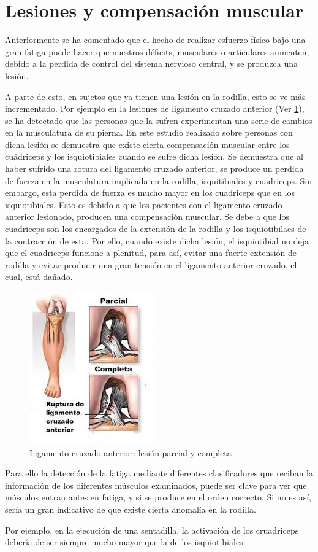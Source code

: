 \section{Lesiones y compensación muscular}\label{compM}
Anteriormente se ha comentado que el hecho de realizar esfuerzo físico bajo una gran fatiga puede hacer que nuestros déficits, musculares o articulares aumenten, debido a la perdida de control del sistema nervioso central, y se produzca una lesión.

A parte de esto, en sujetos que ya tienen una lesión en la rodilla, esto se ve más incrementado. Por ejemplo en la lesiones de ligamento cruzado anterior (Ver \ref{fig:lca}), se ha detectado que las personas que la sufren experimentan una serie de cambios en la musculatura de su pierna. En este estudio realizado sobre personas con dicha lesión \cite{kim2018influencia} se demuestra que existe cierta compensación muscular entre los cuádriceps y los isquiotibiales cuando se sufre dicha lesión. Se demuestra que al haber sufrido una rotura del ligamento cruzado anterior, se produce un perdida de fuerza en la musculatura implicada en la rodilla, isquitibiales y cuadriceps. Sin embargo, esta perdida de fuerza es mucho mayor en los cuadriceps que en los isquiotibiales. Esto es  debido a que los pacientes con el ligamento cruzado anterior lesionado, producen una compensación muscular. Se debe a que los cuadriceps son los encargados de la extensión de la rodilla y los isquiotibilaes de la contracción de esta. Por ello, cuando existe dicha lesión, el isquiotibial no deja que el cuadriceps funcione a plenitud, para así, evitar una fuerte extensión de rodilla y evitar producir una gran tensión en el ligamento anterior cruzado, el cual, está dañado.

\begin{figure}[ht]
\centering
\includegraphics[scale=0.75]{imagenes/lca.jpeg}
\caption{Ligamento cruzado anterior: lesión parcial y completa \cite{imagenLCA}}
\label{fig:lca}
\end{figure}


Para ello la detección de la fatiga mediante diferentes clasificadores que reciban la información de los diferentes músculos examinados, puede ser clave para ver que músculos entran antes en fatiga, y si se produce en el orden correcto. Si no es así, sería un gran indicativo de que existe cierta anomalía en la rodilla. 

Por ejemplo, en la ejecución de una sentadilla, la activación de los cruadriceps debería de ser siempre mucho mayor que la de los isquiotibiales.





